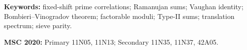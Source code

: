 \documentclass[11pt]{article}
\theoremstyle{definition}
\theoremstyle{remark}
\begin{document}
\noindent\textbf{Keywords:} fixed-shift prime correlations; Ramanujan
sums; Vaughan identity; Bombieri--Vinogradov theorem; factorable moduli;
Type-II sums; translation spectrum; sieve parity.

\medskip
\noindent\textbf{MSC 2020:} Primary 11N05, 11N13; Secondary
11N35, 11N37, 42A05.













\end{document}
